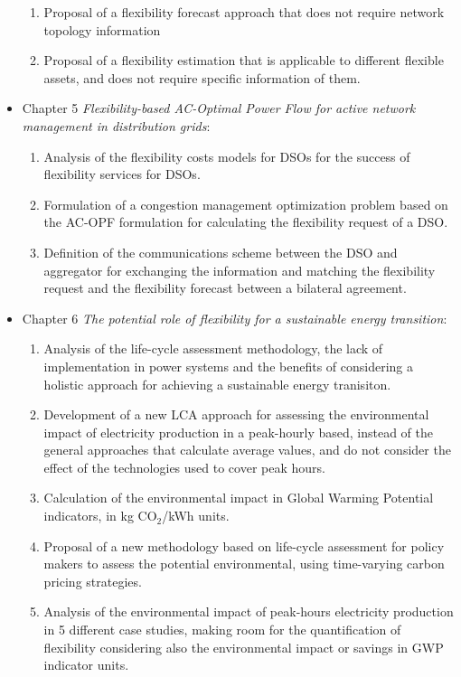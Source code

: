 \begin{itemize}
\begin{enumerate}
		\item Proposal of a flexibility forecast approach that does not require network topology information
		\item Proposal of a flexibility estimation that is applicable to different flexible assets, and does not require specific information of them. 
	\end{enumerate}
\item Chapter 5 \textit{Flexibility-based AC-Optimal Power Flow for active network management in distribution grids}: 
	\begin{enumerate}
		\item Analysis of the flexibility costs models for DSOs for the success of flexibility services for DSOs. 
		\item Formulation of a congestion management optimization problem based on the AC-OPF formulation for calculating the flexibility request of a DSO.
		\item Definition of the communications scheme between the DSO and aggregator for exchanging the information and matching the flexibility request and the flexibility forecast between a bilateral agreement.
	\end{enumerate}
\item Chapter 6 \textit{The potential role of flexibility for a sustainable energy transition}: 
	\begin{enumerate}
		\item Analysis of the life-cycle assessment methodology, the lack of implementation in power systems and the benefits of considering a holistic approach for achieving a sustainable energy tranisiton. 
		\item Development of a new LCA approach for assessing the environmental impact of electricity production in a peak-hourly based, instead of the general approaches that calculate average values, and do not consider the effect of the technologies used to cover peak hours. 
		\item Calculation of the environmental impact in Global Warming Potential indicators, in kg CO$_2$/kWh units. 
		\item Proposal of a new methodology based on life-cycle assessment for policy makers to assess the potential environmental, using time-varying carbon pricing strategies. 
		\item Analysis of the environmental impact of peak-hours electricity production in 5 different case studies, making room for the quantification of flexibility considering also the environmental impact or savings in GWP indicator units. 
	\end{enumerate}
\end{itemize}
	


